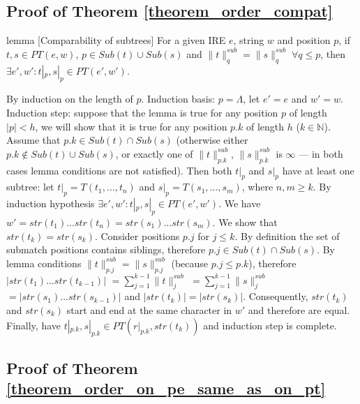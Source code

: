 \documentclass[AMA,STIX1COL]{WileyNJD-v2}
\newcommand{\YN}{\mathbb{N}}
\newcommand{\PT}{PT}
\newcommand{\snorm}[2]{\|{#1}\|^{sub}_{#2}}
\begin{document}


\subsection*{Proof of Theorem \ref{theorem_order_compat}}

\begin{theoremEnd}{lemma}
[Comparability of subtrees]
    \label{lemma_subtrees}
    For a given IRE $e$, string $w$ and position $p$,
    if $t, s \in \PT(e, w)$, $p \in Sub(t) \cup Sub(s)$ and $\snorm{t}{q} = \snorm{s}{q} \; \forall q \leq p$,
    then $\exists e', w' : t|_p, s|_p \in \PT(e', w')$.
\end{theoremEnd}
\begin{proofEnd}
    By induction on the length of $p$.
    Induction basis: $p = \Lambda$, let $e' = e$ and $w' = w$.
    Induction step: suppose that the lemma is true for any position $p$ of length
    $|p| < h$, we will show that it is true for any position $p.k$ of length $h$
    ($k \in \YN$).
    Assume that $p.k \in Sub(t) \cap Sub(s)$
    (otherwise either $p.k \not\in Sub(t) \cup Sub(s)$,
    or exactly one of $\snorm{t}{p.k}$, $\snorm{s}{p.k}$ is $\infty$ --- in both
    cases lemma conditions are not satisfied).
    Then both $t|_p$ and $s|_p$ have at least one subtree: let
    $t|_{p} = T(t_1, \dots, t_n)$ and
    $s|_{p} = T(s_1, \dots, s_m)$, where $n, m \geq k$.
    By induction hypothesis $\exists e', w' : t|_p, s|_p \in \PT(e', w')$.
    We have $w' = str(t_1) \dots str(t_n) = str(s_1) \dots str(s_m)$.
    We show that $str(t_k) = str(s_k)$.
    Consider positions $p.j$ for $j \leq k$.
    By definition the set of submatch positions contains siblings,
    therefore $p.j \in Sub(t) \cap Sub(s)$.
    By lemma conditions $\snorm{t}{p.j} = \snorm{s}{p.j}$ (because $p.j \leq p.k$),
    therefore $|str(t_1) \dots str(t_{k-1})|$
    $= \sum\nolimits_{j=1}^{k-1}\snorm{t}{j}$
    $= \sum\nolimits_{j=1}^{k-1}\snorm{s}{j}$
    $= |str(s_1) \dots str(s_{k-1})|$ and
    $|str(t_k)| = |str(s_k)|$.
    Consequently, $str(t_k)$ and $str(s_k)$ start and end at the same character in $w'$ and therefore are equal.
    Finally, have $t|_{p.k}, s|_{p.k} \in \PT(r|_{p.k}, str(t_k))$ and induction step is complete.
\end{proofEnd}



\subsection*{Proof of Theorem \ref{theorem_order_on_pe_same_as_on_pt}}
\end{document}
